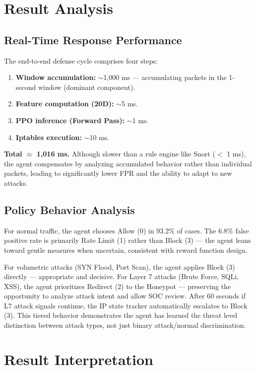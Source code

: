 \documentclass[12pt,a4paper]{report}
\begin{document}
\section{Result Analysis}

\subsection{Real-Time Response Performance}

The end-to-end defense cycle comprises four steps:
\begin{enumerate}
  \item \textbf{Window accumulation:} $\sim$1,000 ms --- accumulating packets in the 1-second window (dominant component).
  \item \textbf{Feature computation (20D):} $\sim$5 ms.
  \item \textbf{PPO inference (Forward Pass):} $\sim$1 ms.
  \item \textbf{Iptables execution:} $\sim$10 ms.
\end{enumerate}

\textbf{Total $\approx$ 1,016 ms.} Although slower than a rule engine like Snort ($<$ 1 ms), the agent compensates by analyzing accumulated behavior rather than individual packets, leading to significantly lower FPR and the ability to adapt to new attacks.

\subsection{Policy Behavior Analysis}

For normal traffic, the agent chooses Allow (0) in 93.2\% of cases. The 6.8\% false positive rate is primarily Rate Limit (1) rather than Block (3) --- the agent leans toward gentle measures when uncertain, consistent with reward function design.

For volumetric attacks (SYN Flood, Port Scan), the agent applies Block (3) directly --- appropriate and decisive. For Layer 7 attacks (Brute Force, SQLi, XSS), the agent prioritizes Redirect (2) to the Honeypot --- preserving the opportunity to analyze attack intent and allow SOC review. After 60 seconds if L7 attack signals continue, the IP state tracker automatically escalates to Block (3). This tiered behavior demonstrates the agent has learned the threat level distinction between attack types, not just binary attack/normal discrimination.

\section{Result Interpretation}
\end{document}

